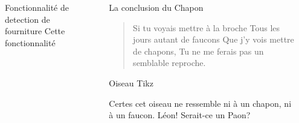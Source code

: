 \documentclass{ENSEIRB_poster}
\begin{document}
\begin{frame}[t]
\begin{columns}[c]
\begin{column}{\twocolwidth}
      \vfill
      \begin{block}{Fonctionnalité de detection de fourniture}
        Cette fonctionnalité
      \end{block}
      \vfill
    \end{column}

    \begin{column}{\sepwidth}\end{column} %

    \begin{column}{\fourcolwidth}
      \begin{block}{La conclusion du Chapon}

        \begin{quote}
          Si tu voyais mettre à la broche \newline
          Tous les jours autant de faucons \newline
          Que j’y vois mettre de chapons, \newline
          Tu ne me ferais pas un semblable reproche. 
        \end{quote}
      \end{block}

      \begin{exampleblock}{Oiseau Tikz}
        \begin{figure}[ht!]
          \begin{center}
            
          \end{center}
        \end{figure}
        Certes cet oiseau ne ressemble ni à un chapon, ni à un faucon. Léon! Serait-ce un Paon?
      \end{exampleblock}

    \end{column}

    \begin{column}{\sepwidth}\end{column} %
  \end{columns}

\end{frame}
\end{document}
